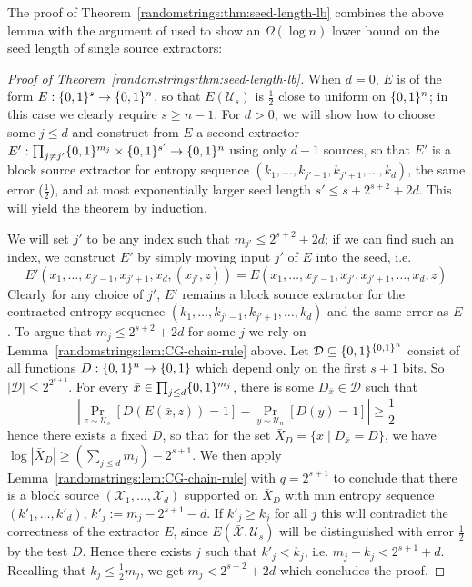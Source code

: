 The proof of Theorem~\ref{randomstrings:thm:seed-length-lb} combines the above lemma with the argument of \cite{NZ} used to show an $\Omega(\log n)$ lower bound on the seed length of single source extractors:
\begin{proof}[Proof of Theorem~\ref{randomstrings:thm:seed-length-lb}]
When $d = 0$, $E$ is of the form $E: \{0,1\}^s \to \{0,1\}^n$, so that $E(\mathcal{U}_s)$ is $\frac{1}{2}$ close to uniform on $\{0,1\}^n$; in this case we clearly require $s \geq n-1$. For $d> 0$, we will show how to choose some $j \leq d$ and construct from $E$ a second extractor $E':\prod_{j \neq j'} \{0,1\}^{m_j} \times \{0,1\}^{s'} \to \{0,1\}^n$ using only $d-1$ sources, so that $E'$ is a block source extractor for entropy sequence $(k_1,\ldots,k_{j'-1},k_{j'+1},\ldots,k_d)$, the same error ($\frac{1}{2}$), and at most exponentially larger seed length $s' \leq s + 2^{s+2} + 2d$. This will yield the theorem by induction.

We will set $j'$ to be any index such that $m_{j'}\leq 2^{s+2}+ 2d$; if we can find such an index, we construct $E'$ by simply moving input $j'$ of $E$ into the seed, i.e.
\[
E'(x_1,\ldots,x_{j'-1}, x_{j'+1}, x_d, (x_{j'},z)) = E(x_1,\ldots,x_{j'-1},x_{j'},x_{j'+1},\ldots,x_d,z)
\]
Clearly for any choice of $j'$, $E'$ remains a block source extractor for the contracted entropy sequence $(k_1,\ldots,k_{j'-1},k_{j'+1},\ldots,k_d)$ and the same error as $E$.
To argue that $m_j \leq 2^{s+2} + 2d$ for some $j$ we rely on Lemma~\ref{randomstrings:lem:CG-chain-rule} above. Let $\mathcal{D} \subseteq \{0,1\}^{\{0,1\}^n}$ consist of all functions $D: \{0,1\}^n \to \{0,1\}$ which depend only on the first $s+1$ bits. So $|\mathcal{D}| \leq 2^{2^{s+1}}$. For every $\bar{x} \in \prod_{j \leq d} \{0,1\}^{m_j}$, there is some $D_{\bar{x}} \in \mathcal{D}$ such that 
\[
|\Pr_{z \sim \mathcal{U}_s} [D(E(\bar{x},z)) = 1] - \Pr_{y \sim \mathcal{U}_n} [D(y) = 1] | \geq \frac{1}{2}
\] 
hence there exists a fixed $D$, so that for the set $\bar{X}_D = \{\bar{x} \mid D_{\bar{x}}=D\}$, 
we have $\log |\bar{X}_D| \geq (\sum_{j\leq d} m_j) - 2^{s+1}$. We then apply Lemma~\ref{randomstrings:lem:CG-chain-rule} with $q = 2^{s+1}$ to conclude that there is a block source $(\mathcal{X}_1,\ldots,\mathcal{X}_d)$ supported on $\bar{X}_D$ with min entropy sequence $(k'_1,\ldots,k'_d)$, $k'_j := m_j - 2^{s+1} - d$. If $k'_j \geq k_j$ for all $j$ this will contradict the correctness of the extractor $E$, since $E(\bar{\mathcal{X}}, \mathcal{U}_s)$ will be distinguished with error $\frac{1}{2}$ by the test $D$. Hence there exists $j$ such that $k'_j < k_j$, i.e. $m_j - k_j < 2^{s+1} + d$. Recalling that $k_j \leq \frac{1}{2}m_j$, we get $m_j < 2^{s+2} + 2d$ which concludes the proof.
\end{proof}

